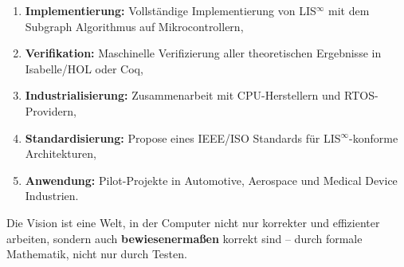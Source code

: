 \documentclass[a4paper,12pt]{article}
\theoremstyle{definition}
\begin{document}
\begin{enumerate}
	\item \textbf{Implementierung:} Vollständige Implementierung von LIS$^{\infty}$ mit dem Subgraph Algorithmus auf Mikrocontrollern,
	\item \textbf{Verifikation:} Maschinelle Verifizierung aller theoretischen Ergebnisse in Isabelle/HOL oder Coq,
	\item \textbf{Industrialisierung:} Zusammenarbeit mit CPU-Herstellern und RTOS-Providern,
	\item \textbf{Standardisierung:} Propose eines IEEE/ISO Standards für LIS$^{\infty}$-konforme Architekturen,
	\item \textbf{Anwendung:} Pilot-Projekte in Automotive, Aerospace und Medical Device Industrien.
\end{enumerate}

Die Vision ist eine Welt, in der Computer nicht nur korrekter und effizienter arbeiten, sondern auch \textbf{bewiesenermaßen} korrekt sind -- durch formale Mathematik, nicht nur durch Testen.
\end{document}
